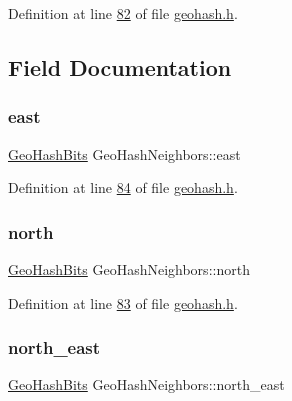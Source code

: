 Definition at line \hyperlink{geohash_8h_source_l00082}{82} of file \hyperlink{geohash_8h_source}{geohash.\+h}.



\subsection{Field Documentation}
\mbox{\label{structGeoHashNeighbors_a9fcea5ce0b4fec47977600baf024cd75}} 
\subsubsection{\texorpdfstring{east}{east}}
{\footnotesize\ttfamily \hyperlink{structGeoHashBits}{Geo\+Hash\+Bits} Geo\+Hash\+Neighbors\+::east}



Definition at line \hyperlink{geohash_8h_source_l00084}{84} of file \hyperlink{geohash_8h_source}{geohash.\+h}.

\mbox{\label{structGeoHashNeighbors_a9296b6335da611407c98ceff8086af8d}} 
\subsubsection{\texorpdfstring{north}{north}}
{\footnotesize\ttfamily \hyperlink{structGeoHashBits}{Geo\+Hash\+Bits} Geo\+Hash\+Neighbors\+::north}



Definition at line \hyperlink{geohash_8h_source_l00083}{83} of file \hyperlink{geohash_8h_source}{geohash.\+h}.

\mbox{\label{structGeoHashNeighbors_ab96bac54bbb5e9ec39a17ec4560c6530}} 
\subsubsection{\texorpdfstring{north\+\_\+east}{north\_east}}
{\footnotesize\ttfamily \hyperlink{structGeoHashBits}{Geo\+Hash\+Bits} Geo\+Hash\+Neighbors\+::north\+\_\+east}



